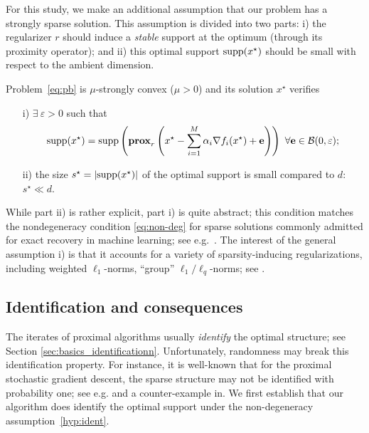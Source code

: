 For this study, we make an additional assumption that our problem has a strongly sparse solution. This assumption is divided into two parts: i) the regularizer $r$ should induce a \emph{stable} support at the optimum (through its proximity operator); and ii) this optimal support $\mathrm{supp}(x^\star)$ should be small with respect to the ambient dimension.
\begin{assumption} \label{hyp:ident}
Problem~\eqref{eq:pb} is $\mu$-strongly convex ($\mu>0$) and its solution $x^\star$ verifies
\begin{itemize}
   \item[i)] $\exists~ \varepsilon>0$ such that 
   $$
   \mathrm{supp}(x^\star) = \mathrm{supp} \left( \mathbf{prox}_{r} \left( x^\star - \sum_{i=1}^M  \alpha_i  \nabla f_i(x^\star) + \mathbf{e}   \right)   \right)~ \forall \mathbf{e} \in \mathcal{B}(0,\varepsilon);
   $$
    \item[ii)] the size $s^\star =|\mathrm{supp}(x^\star)|$ of the optimal support is small compared to $d$: $s^\star\ll d$.
\end{itemize}
\end{assumption}
While part ii) is rather explicit, part i) is quite abstract; 
this condition matches the nondegeneracy condition \eqref{eq:non-deg} for sparse solutions commonly admitted for exact recovery in machine learning; see e.g.~\cite{nutini2019active,pmlr-v89-sun19a}.
The interest of the general assumption i) is that it accounts for a variety of sparsity-inducing regularizations, including weighted $\ell_1$-norms, ``group'' $\ell_1/\ell_q$-norms; see \cite[Sec.~3.3]{bach2012optimization}.

\subsection{Identification and consequences} \label{sec:identif2}

The iterates of proximal algorithms usually \emph{identify} the optimal structure; see Section \ref{sec:basics_identificationn}. %
Unfortunately, randomness may break this identification property. For instance, it is well-known that for the proximal stochastic gradient descent, the sparse structure may not be identified with probability one; see e.g.\;\cite{lee2012manifold} and a counter-example in\;\cite{poon2018local}. We first establish that our algorithm does identify the optimal support under the non-degeneracy assumption~\ref{hyp:ident}.

